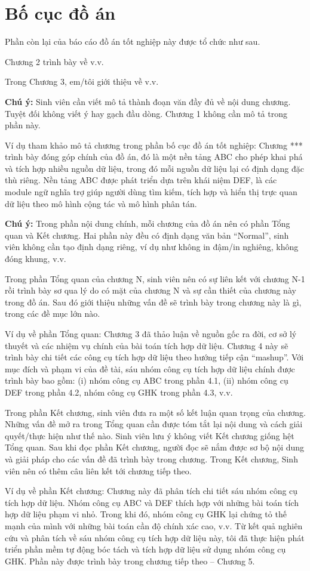 \documentclass[../DoAn.tex]{subfiles}
\begin{document}
\section{Bố cục đồ án}
\label{section:1.4}
Phần còn lại của báo cáo đồ án tốt nghiệp này được tổ chức như sau. 

Chương 2 trình bày về v.v. 

Trong Chương 3, em/tôi giới thiệu về v.v.

\textbf{Chú ý:} Sinh viên cần viết mô tả thành đoạn văn đầy đủ về nội dung chương. Tuyệt đối không viết ý hay gạch đầu dòng. Chương 1 không cần mô tả trong phần này. 

Ví dụ tham khảo mô tả chương trong phần bố cục đồ án tốt nghiệp: Chương *** trình bày đóng góp chính của đồ án, đó là một nền tảng ABC cho phép khai phá và tích hợp nhiều nguồn dữ liệu, trong đó mỗi nguồn dữ liệu lại có định dạng đặc thù riêng. Nền tảng ABC được phát triển dựa trên khái niệm DEF, là các module ngữ nghĩa trợ giúp người dùng tìm kiếm, tích hợp và hiển thị trực quan dữ liệu theo mô hình cộng tác và mô hình phân tán.

\textbf{Chú ý:} Trong phần nội dung chính, mỗi chương của đồ án nên có phần Tổng quan và Kết chương. Hai phần này đều có định dạng văn bản “Normal”, sinh viên không cần tạo định dạng riêng, ví dụ như không in đậm/in nghiêng, không đóng khung, v.v. 

Trong phần Tổng quan của chương N, sinh viên nên có sự liên kết với chương N-1 rồi trình bày sơ qua lý do có mặt của chương N và sự cần thiết của chương này trong đồ án. Sau đó giới thiệu những vấn đề sẽ trình bày trong chương này là gì, trong các đề mục lớn nào.

Ví dụ về phần Tổng quan: Chương 3 đã thảo luận về nguồn gốc ra đời, cơ sở lý thuyết và các nhiệm vụ chính của bài toán tích hợp dữ liệu. Chương 4 này sẽ trình bày chi tiết các công cụ tích hợp dữ liệu theo hướng tiếp cận “mashup”. Với mục đích và phạm vi của đề tài, sáu nhóm công cụ tích hợp dữ liệu chính được trình bày bao gồm: (i) nhóm công cụ ABC trong phần 4.1, (ii) nhóm công cụ DEF trong phần 4.2, nhóm công cụ GHK trong phần 4.3, v.v.

Trong phần Kết chương, sinh viên đưa ra một số kết luận quan trọng của chương. Những vấn đề mở ra trong Tổng quan cần được tóm tắt lại nội dung và cách giải quyết/thực hiện như thế nào. Sinh viên lưu ý không viết Kết chương giống hệt Tổng quan. Sau khi đọc phần Kết chương, người đọc sẽ nắm được sơ bộ nội dung và giải pháp cho các vấn đề đã trình bày trong chương. Trong Kết chương, Sinh viên nên có thêm câu liên kết tới chương tiếp theo.

Ví dụ về phần Kết chương: Chương này đã phân tích chi tiết sáu nhóm công cụ tích hợp dữ liệu. Nhóm công cụ ABC và DEF thích hợp với những bài toán tích hợp dữ liệu phạm vi nhỏ. Trong khi đó, nhóm công cụ GHK lại chứng tỏ thế mạnh của mình với những bài toán cần độ chính xác cao, v.v. Từ kết quả nghiên cứu và phân tích về sáu nhóm công cụ tích hợp dữ liệu này, tôi đã thực hiện phát triển phần mềm tự động bóc tách và tích hợp dữ liệu sử dụng nhóm công cụ GHK. Phần này được trình bày trong chương tiếp theo – Chương 5.
\end{document}
